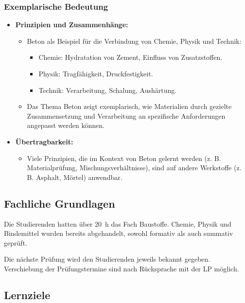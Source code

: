\documentclass[
11pt,
captions=tableheading,
smallheadings,
headsepline,
footsepline, 
captions=tableheading,
parskip=half-,
]{scrartcl}
\begin{document}
\subsubsection{Exemplarische Bedeutung}
\begin{itemize}
    \item \textbf{Prinzipien und Zusammenhänge:}
          \begin{itemize}
              \item Beton als Beispiel für die Verbindung von Chemie, Physik und Technik:
                    \begin{itemize}
                        \item Chemie: Hydratation von Zement, Einfluss von Zusatzstoffen.
                        \item Physik: Tragfähigkeit, Druckfestigkeit.
                        \item Technik: Verarbeitung, Schalung, Aushärtung.
                    \end{itemize}
              \item Das Thema Beton zeigt exemplarisch, wie Materialien durch gezielte Zusammensetzung und Verarbeitung an spezifische Anforderungen angepasst werden können.
          \end{itemize}
    \item \textbf{Übertragbarkeit:}
          \begin{itemize}
              \item Viele Prinzipien, die im Kontext von Beton gelernt werden (z. B. Materialprüfung, Mischungsverhältnisse), sind auf andere Werkstoffe (z. B. Asphalt, Mörtel) anwendbar.
          \end{itemize}
\end{itemize}




\subsection{Fachliche Grundlagen}
Die Studierenden hatten über \SI{20}{\hour} das Fach Baustoffe.
Chemie, Physik und Bindemittel wurden bereits abgehandelt, sowohl formativ als auch summativ geprüft.

Die nächste Prüfung wird den Studierenden jeweils bekannt gegeben.
Verschiebung der Prüfungstermine sind nach Rücksprache mit der LP möglich.



\subsection{Lernziele}
\end{document}
